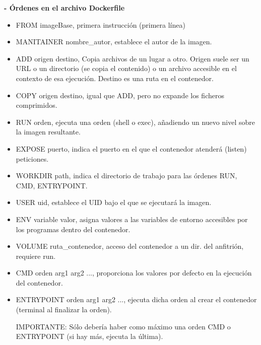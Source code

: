 \documentclass[12pt]{amsart}
\begin{document}
    {\bf - Órdenes en el archivo Dockerfile} 
    \begin{itemize}
    
    \item  FROM imageBase, primera instrucción (primera línea)
    
    \item MANITAINER nombre\_autor, establece el autor de la imagen.
    
    \item  ADD origen destino, Copia archivos de un lugar a otro. Origen suele ser un URL o un directorio (se copia el contenido) o un archivo accesible en el contexto de esa ejecución. Destino es una ruta en el contenedor.
    
    \item COPY origen destino, igual que ADD, pero no expande los ficheros comprimidos.
    
    \item RUN orden, ejecuta una orden (shell o exec), añadiendo un nuevo nivel sobre la imagen resultante.
    
    \item EXPOSE puerto, indica el puerto en el que el contenedor atenderá (listen) peticiones.
    
    \item  WORKDIR path, indica el directorio de trabajo para las órdenes RUN, CMD, ENTRYPOINT.
    
    \item USER uid, establece el UID bajo el que se ejecutará la imagen.
    
    \item ENV variable valor, asigna valores a las variables de entorno accesibles por los programas dentro del contenedor.
    
    \item VOLUME ruta\_contenedor, acceso del contenedor a un dir. del anfitrión, requiere run.
    
    \item CMD orden arg1 arg2 ..., proporciona los valores por defecto en la ejecución del contenedor.
    
    \item ENTRYPOINT orden arg1 arg2 ..., ejecuta dicha orden al crear el contenedor (terminal al finalizar la orden).
    
    
    IMPORTANTE: Sólo debería haber como máximo una orden CMD o ENTRYPOINT (si hay más, ejecuta la última).
    
    \end{itemize}
    
\end{document}
